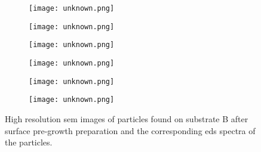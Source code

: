 \begin{figure}
    \centering
    \begin{subfigure}[t]{\textwidth}
          \begin{minipage}[t]{0.49\linewidth}
            \centering
            \texttt{[image: unknown.png]}
          \end{minipage}
          \hspace{0.02\linewidth}
          \begin{minipage}[t]{0.49\linewidth}
            \centering
            \texttt{[image: unknown.png]}
          \end{minipage}
        \caption{}\label{fig:add_label}
    \end{subfigure}
    \par\bigskip
    \begin{subfigure}[t]{\textwidth}
          \begin{minipage}[t]{0.49\linewidth}
            \centering
            \texttt{[image: unknown.png]}
          \end{minipage}
          \hspace{0.02\linewidth}
          \begin{minipage}[t]{0.49\linewidth}
            \centering
            \texttt{[image: unknown.png]}
          \end{minipage}
        \caption{}\label{fig:add_label}
    \end{subfigure}
    \par\bigskip
    \begin{subfigure}[t]{\textwidth}
          \begin{minipage}[t]{0.49\linewidth}
            \centering
            \texttt{[image: unknown.png]}
          \end{minipage}
          \hspace{0.02\linewidth}
          \begin{minipage}[t]{0.49\linewidth}
            \centering
            \texttt{[image: unknown.png]}
          \end{minipage}
        \caption{}\label{fig:add_label}
    \end{subfigure}
    \caption[\Ac{sem} images and \ac{eds} spectra of particles found on substrate B after surface pre-growth preparation.]{High resolution \acf{sem} images of particles found on substrate B after surface pre-growth preparation and the corresponding \acf{eds} spectra of the particles.}\label{fig:subBb_sem_w_eds}
\end{figure}

